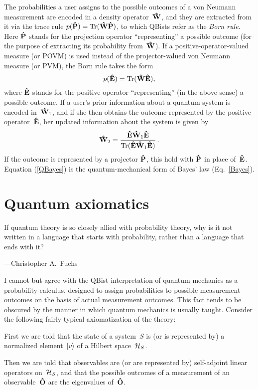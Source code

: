 \documentclass[12pt]{article}
\newcommand{\ket}[1]{|#1\rangle}
\newcommand{\be}{\begin{equation}}
\newcommand{\ee}{\end{equation}}
\newcommand{\hE}{{\bf\hat E}}
\newcommand{\hP}{{\bf\hat P}}
\newcommand{\hW}{{\bf\hat W}}
\newcommand{\hO}{{\bf\hat O}}
\newcommand{\cH}{{\cal H}}
\begin{document}
The probabilities a user assigns to the possible outcomes of a von Neumann measurement are encoded in a density operator~$\hW$, and they are extracted from it via the trace rule $p(\hP)=\hbox{Tr}(\hW\hP)$, to which QBists refer as the \emph{Born rule}. Here $\hP$ stands for the projection operator ``representing'' a possible outcome (for the purpose of extracting its probability from~$\hW$). If a positive-operator-valued measure (or POVM) is used instead of the projector-valued von Neumann measure (or PVM), the Born rule takes the form
\be
p(\hE)=\hbox{Tr}(\hW\hE),
\ee
where $\hE$ stands for the positive operator ``representing'' (in the above sense) a possible outcome. If a user's prior information about a quantum system is encoded in~$\hW_1$, and if she then obtains the outcome represented by the positive operator~$\hE$, her updated information about the system is given by
\be
	\hW_2=\frac{\hE\hW_1\hE}{\hbox{Tr}(\hE\hW_1\hE)}\,.
\label{QBayes}
\ee
If the outcome is represented by a projector $\hP$, this hold with $\hP$ in place of~$\hE$. Equation (\ref{QBayes}) is the quantum-mechanical form of Bayes' law (Eq.~\ref{Bayes}).


\section{Quantum axiomatics}\label{sec.qa}
{\leftskip\parindent\small If quantum theory is so closely allied with probability theory, why is it not written in a language that starts with probability, rather than a language that ends with it?\par\hfill---Christopher A.\ Fuchs \cite{Fuchs_Perimeter}\par}\medskip

\noindent I cannot but agree with the QBist interpretation of quantum mechanics as a probability calculus, designed to assign probabilities to possible measurement outcomes on the basis of actual measurement outcomes. This fact tends to be obscured by the manner in which quantum mechanics is usually taught. Consider the following fairly typical axiomatization of the theory:

First we are told that the state of a system~$S$ is (or is represented by) a normalized element~$\ket v$ of a Hilbert space~$\cH_S$.

Then we are told that observables are (or are represented by) self-adjoint linear operators on~$\cH_S$, and that the possible outcomes of a measurement of an observable~$\hO$ are the eigenvalues of~$\hO$.
\end{document}
